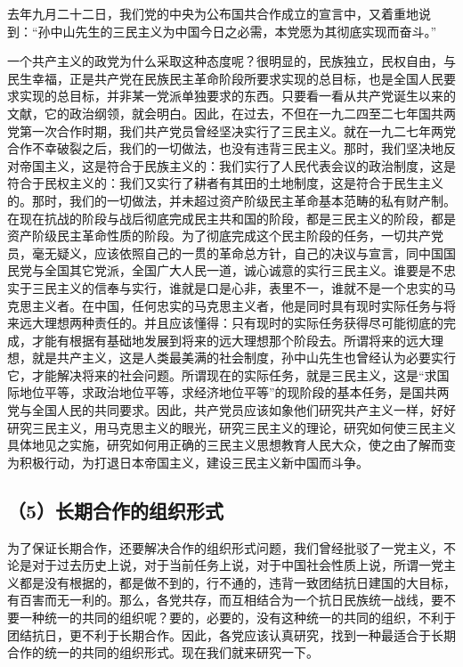 去年九月二十二日，我们党的中央为公布国共合作成立的宣言中，又着重地说到：“孙中山先生的三民主义为中国今日之必需，本党愿为其彻底实现而奋斗。”

一个共产主义的政党为什么采取这种态度呢？很明显的，民族独立，民权自由，与民生幸福，正是共产党在民族民主革命阶段所要求实现的总目标，也是全国人民要求实现的总目标，并非某一党派单独要求的东西。只要看一看从共产党诞生以来的文献，它的政治纲领，就会明白。因此，在过去，不但在一九二四至二七年国共两党第一次合作时期，我们共产党员曾经坚决实行了三民主义。就在一九二七年两党合作不幸破裂之后，我们的一切做法，也没有违背三民主义。那时，我们坚决地反对帝国主义，这是符合于民族主义的：我们实行了人民代表会议的政治制度，这是符合于民权主义的：我们又实行了耕者有其田的土地制度，这是符合于民生主义的。那时，我们的一切做法，并未超过资产阶级民主革命基本范畴的私有财产制。在现在抗战的阶段与战后彻底完成民主共和国的阶段，都是三民主义的阶段，都是资产阶级民主革命性质的阶段。为了彻底完成这个民主阶段的任务，一切共产党员，毫无疑义，应该依照自己的一贯的革命总方针，自己的决议与宣言，同中国国民党与全国其它党派，全国广大人民一道，诚心诚意的实行三民主义。谁要是不忠实于三民主义的信奉与实行，谁就是口是心非，表里不一，谁就不是一个忠实的马克思主义者。在中国，任何忠实的马克思主义者，他是同时具有现时实际任务与将来远大理想两种责任的。并且应该懂得：只有现时的实际任务获得尽可能彻底的完成，才能有根据有基础地发展到将来的远大理想那个阶段去。所谓将来的远大理想，就是共产主义，这是人类最美满的社会制度，孙中山先生也曾经认为必要实行它，才能解决将来的社会问题。所谓现在的实际任务，就是三民主义，这是“求国际地位平等，求政治地位平等，求经济地位平等”的现阶段的基本任务，是国共两党与全国人民的共同要求。因此，共产党员应该如象他们研究共产主义一样，好好研究三民主义，用马克思主义的眼光，研究三民主义的理论，研究如何使三民主义具体地见之实施，研究如何用正确的三民主义思想教育人民大众，使之由了解而变为积极行动，为打退日本帝国主义，建设三民主义新中国而斗争。

\subsection{（5）长期合作的组织形式}

为了保证长期合作，还要解决合作的组织形式问题，我们曾经批驳了一党主义，不论是对于过去历史上说，对于当前任务上说，对于中国社会性质上说，所谓一党主义都是没有根据的，都是做不到的，行不通的，违背一致团结抗日建国的大目标，有百害而无一利的。那么，各党共存，而互相结合为一个抗日民族统一战线，要不要一种统一的共同的组织呢？要的，必要的，没有这种统一的共同的组织，不利于团结抗日，更不利于长期合作。因此，各党应该认真研究，找到一种最适合于长期合作的统一的共同的组织形式。现在我们就来研究一下。

